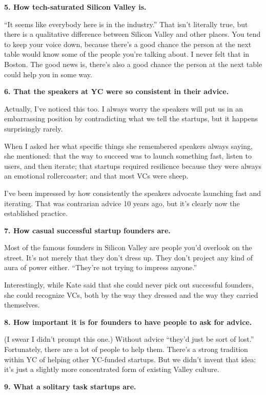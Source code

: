 \documentclass[12pt]{book}
\begin{document}
\textbf{5. How tech-saturated Silicon Valley is.}

``It seems like everybody here is in the industry.'' That isn't
literally true, but there is a qualitative difference between Silicon
Valley and other places. You tend to keep your voice down, because
there's a good chance the person at the next table would know some of
the people you're talking about. I never felt that in Boston. The good
news is, there's also a good chance the person at the next table could
help you in some way.

\textbf{6. That the speakers at YC were so consistent in their advice.}

Actually, I've noticed this too. I always worry the speakers will put us
in an embarrassing position by contradicting what we tell the startups,
but it happens surprisingly rarely.

When I asked her what specific things she remembered speakers always
saying, she mentioned: that the way to succeed was to launch something
fast, listen to users, and then iterate; that startups required
resilience because they were always an emotional rollercoaster; and that
most VCs were sheep.

I've been impressed by how consistently the speakers advocate launching
fast and iterating. That was contrarian advice 10 years ago, but it's
clearly now the established practice.

\textbf{7. How casual successful startup founders are.}

Most of the famous founders in Silicon Valley are people you'd overlook
on the street. It's not merely that they don't dress up. They don't
project any kind of aura of power either. ``They're not trying to
impress anyone.''

Interestingly, while Kate said that she could never pick out successful
founders, she could recognize VCs, both by the way they dressed and the
way they carried themselves.

\textbf{8. How important it is for founders to have people to ask for
advice.}

(I swear I didn't prompt this one.) Without advice ``they'd just be sort
of lost.'' Fortunately, there are a lot of people to help them. There's
a strong tradition within YC of helping other YC-funded startups. But we
didn't invent that idea: it's just a slightly more concentrated form of
existing Valley culture.

\textbf{9. What a solitary task startups are.}
\end{document}
